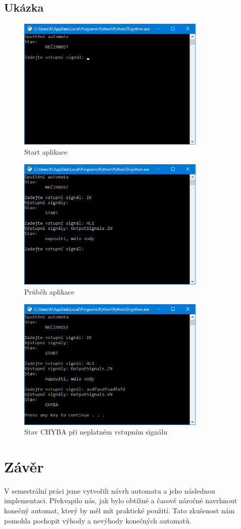 \documentclass[12pt]{report}
\begin{document}
\section{Ukázka}

\begin{figure}[h]
		\centering
		\includegraphics[width=0.8\textwidth]{./images/app_start.png}	
		\caption{Start aplikace}
\end{figure}

\begin{figure}[h]
		\centering
		\includegraphics[width=0.8\textwidth]{./images/app_progress.png}	
		\caption{Průběh aplikace}
\end{figure}

\begin{figure}[h]
		\centering
		\includegraphics[width=0.8\textwidth]{./images/app_error.png}	
		\caption{Stav CHYBA při neplatném vstupním signálu}
\end{figure}

\chapter{Závěr}
V semestrální práci jsme vytvořili návrh automatu a jeho následnou implementaci.
Překvapilo nás, jak bylo obtížné a časově náročné navrhnout konečný automat, který by měl mít praktické použití. Tato zkušenost nám pomohla pochopit výhody a nevýhody konečných automatů.
\end{document}
